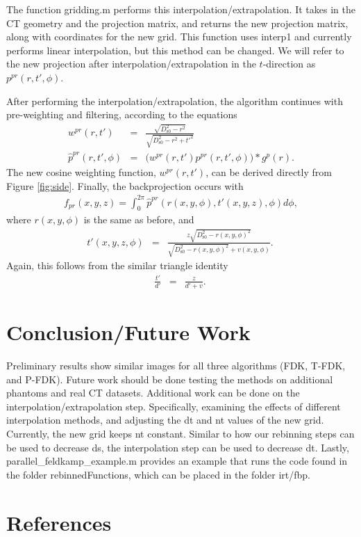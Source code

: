 \documentclass[12pt]{article}
\begin{document}
The function gridding.m performs this interpolation/extrapolation.  It takes
in the CT geometry and the projection matrix, and returns the new projection
matrix, along with coordinates for the new grid.  This function uses interp1
and currently performs linear interpolation, but this method can be changed.
We will refer to the new projection after interpolation/extrapolation in the
$t$-direction as $p^{pr}(r,t',\phi)$.


After performing the interpolation/extrapolation, the algorithm continues with pre-weighting
and filtering, according to the equations
\begin{eqnarray*}
w^{pr}(r,t') &=& \frac{\sqrt{D_\mathrm{s0}^2-r^2}}{\sqrt{D_\mathrm{s0}^2 -r^2+ t'^2}} \\
\hat{p}^{pr}(r,t',\phi) &=& \Big(w^{pr}(r,t') p^{pr}(r,t',\phi)\Big) * g^p(r).
\end{eqnarray*}
The new cosine weighting function, $w^{pr}(r,t')$, can be derived directly from Figure \ref{fig:side}. 
Finally, the backprojection occurs with
\begin{eqnarray*}
f_{pr}(x,y,z) = \int_0^{2\pi} \hat{p}^{pr}(r(x,y,\phi),t'(x,y,z),\phi) d\phi,
\end{eqnarray*}
where $r(x,y,\phi)$ is the same as before, and
\begin{eqnarray*}
t'(x,y,z,\phi) &=& \frac{z\sqrt{D_\mathrm{s0}^2-r(x,y,\phi)^2}}{\sqrt{D_\mathrm{s0}^2-r(x,y,\phi)^2}+v(x,y,\phi)}. \
\end{eqnarray*}
Again, this follows from the similar triangle identity
\begin{eqnarray*}
\frac{t'}{d'} &=& \frac{z}{d'+v}. \
\end{eqnarray*}

\section{Conclusion/Future Work}

Preliminary results show similar images for all three algorithms (FDK, T-FDK,
and P-FDK). Future work should be done testing the methods on additional
phantoms and real CT datasets.  Additional work can be done on the
interpolation/extrapolation step.  Specifically, examining the effects of
different interpolation methods, and adjusting the dt and nt values of the new
grid.  Currently, the new grid keeps nt constant.  Similar to how our
rebinning steps can be used to decrease ds, the interpolation step can be used
to decrease dt.  Lastly, parallel\_feldkamp\_example.m provides an example
that runs the code found in the folder rebinnedFunctions, which can be placed
in the folder irt/fbp.



\section{References}

\cite{grass:00:3cb}
\cite[Section 3.9]{fessler::ir}
\cite{turbell:01:cbr}



\end{document}

